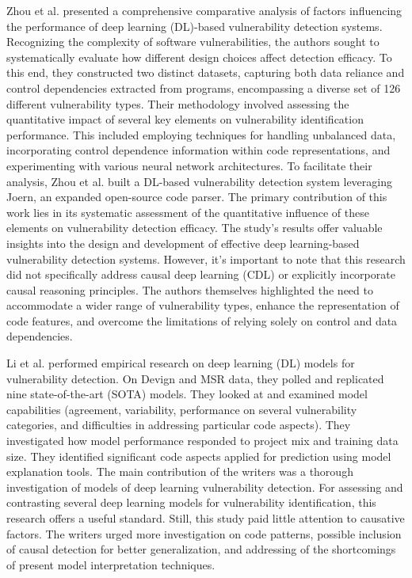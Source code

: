 \documentclass{buthesis}
\begin{document}
Zhou et al. \cite{Zhou2019} presented a comprehensive comparative analysis of factors influencing the performance of deep learning (DL)-based vulnerability detection systems. Recognizing the complexity of software vulnerabilities, the authors sought to systematically evaluate how different design choices affect detection efficacy. To this end, they constructed two distinct datasets, capturing both data reliance and control dependencies extracted from programs, encompassing a diverse set of 126 different vulnerability types. Their methodology involved assessing the quantitative impact of several key elements on vulnerability identification performance. This included employing techniques for handling unbalanced data, incorporating control dependence information within code representations, and experimenting with various neural network architectures. To facilitate their analysis, Zhou et al. built a DL-based vulnerability detection system leveraging Joern, an expanded open-source code parser. The primary contribution of this work lies in its systematic assessment of the quantitative influence of these elements on vulnerability detection efficacy. The study's results offer valuable insights into the design and development of effective deep learning-based vulnerability detection systems. However, it's important to note that this research did not specifically address causal deep learning (CDL) or explicitly incorporate causal reasoning principles. The authors themselves highlighted the need to accommodate a wider range of vulnerability types, enhance the representation of code features, and overcome the limitations of relying solely on control and data dependencies. 

Li et al. \cite{Li2022Empirical} performed empirical research on deep learning (DL) models for vulnerability detection. On Devign and MSR data, they polled and replicated nine state-of-the-art (SOTA) models. They looked at and examined model capabilities (agreement, variability, performance on several vulnerability categories, and difficulties in addressing particular code aspects). They investigated how model performance responded to project mix and training data size. They identified significant code aspects applied for prediction using model explanation tools. The main contribution of the writers was a thorough investigation of models of deep learning vulnerability detection. For assessing and contrasting several deep learning models for vulnerability identification, this research offers a useful standard. Still, this study paid little attention to causative factors. The writers urged more investigation on code patterns, possible inclusion of causal detection for better generalization, and addressing of the shortcomings of present model interpretation techniques.
\end{document}
